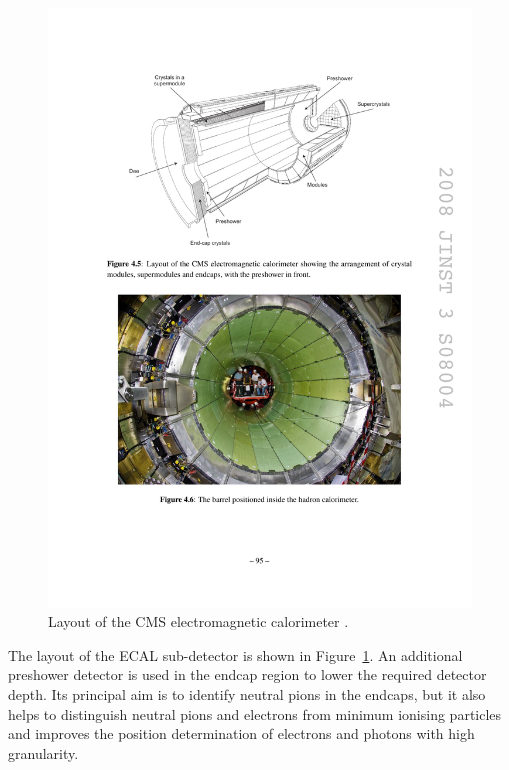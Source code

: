 \begin{figure}[!htbp]
  \centering
  \leavevmode
  \includegraphics[width=\columnwidth]{ECAL}
  \caption{Layout of the CMS electromagnetic calorimeter \autocite{CMS}.}
  \label{fig:ECAL}
\end{figure}

The layout of the ECAL sub-detector is shown in Figure~\ref{fig:ECAL}. An additional preshower detector is used in the
endcap region to lower the required detector depth. Its principal aim is to identify neutral pions in the endcaps, but
it also helps to distinguish neutral pions and electrons from minimum ionising particles and improves the position
determination of electrons and photons with high granularity.

